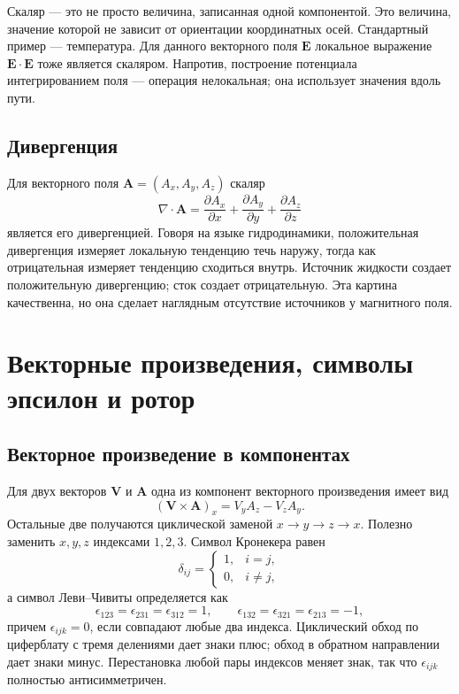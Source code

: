 Скаляр — это не просто величина, записанная одной компонентой. Это величина, значение которой не зависит от ориентации координатных осей. Стандартный пример — температура. Для данного векторного поля \(\mathbf E\) локальное выражение \(\mathbf E\cdot\mathbf E\) тоже является скаляром. Напротив, построение потенциала интегрированием поля — операция нелокальная; она использует значения вдоль пути.

\subsection{Дивергенция}

Для векторного поля \(\mathbf A=(A_x,A_y,A_z)\) скаляр
\begin{equation}
  \nabla\cdot\mathbf A
  =
  \frac{\partial A_x}{\partial x}
  +\frac{\partial A_y}{\partial y}
  +\frac{\partial A_z}{\partial z}
\end{equation}
является его дивергенцией. Говоря на языке гидродинамики, положительная дивергенция измеряет локальную тенденцию течь наружу, тогда как отрицательная измеряет тенденцию сходиться внутрь. Источник жидкости создает положительную дивергенцию; сток создает отрицательную. Эта картина качественна, но она сделает наглядным отсутствие источников у магнитного поля.

\section{Векторные произведения, символы эпсилон и ротор}

\subsection{Векторное произведение в компонентах}

Для двух векторов \(\mathbf V\) и \(\mathbf A\) одна из компонент векторного произведения имеет вид
\begin{equation}
  (\mathbf V\times\mathbf A)_x
  =
  V_yA_z-V_zA_y.
\end{equation}
Остальные две получаются циклической заменой \(x\to y\to z\to x\). Полезно заменить \(x,y,z\) индексами \(1,2,3\). Символ Кронекера равен
\begin{equation}
  \delta_{ij}
  =
  \begin{cases}
    1,&i=j,\\
    0,&i\ne j,
  \end{cases}
\end{equation}
а символ Леви--Чивиты определяется как
\begin{equation}
  \epsilon_{123}=\epsilon_{231}=\epsilon_{312}=1,
  \qquad
  \epsilon_{132}=\epsilon_{321}=\epsilon_{213}=-1,
\end{equation}
причем \(\epsilon_{ijk}=0\), если совпадают любые два индекса. Циклический обход по циферблату с тремя делениями дает знаки плюс; обход в обратном направлении дает знаки минус. Перестановка любой пары индексов меняет знак, так что \(\epsilon_{ijk}\) полностью антисимметричен.

